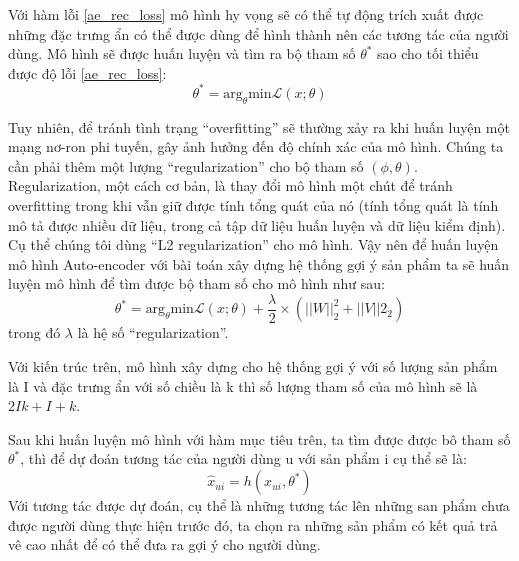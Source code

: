     Với hàm lỗi \ref{ae_rec_loss} mô hình hy vọng sẽ có thể tự động trích xuất được những đặc trưng ẩn có thể được dùng để hình thành nên các tương tác của người dùng.
    Mô hình sẽ được huấn luyện và tìm ra bộ tham số $\theta^*$ sao cho tối thiểu được độ lỗi \ref{ae_rec_loss}: 
    \begin{equation}
        \theta^* = \text{arg}_\theta \text{min}  \mathcal{L}(x;\theta)
    \end{equation}    
    

    Tuy nhiên, để tránh tình trạng ``overfitting'' sẽ thường xảy ra khi huấn luyện một mạng nơ-ron phi tuyến, gây ảnh hưởng đến độ chính xác của mô hình. 
    Chúng ta cần phải thêm một lượng ``regularization'' cho bộ tham số $(\phi,\theta)$.
    Regularization, một cách cơ bản, là thay đổi mô hình một chút để tránh overfitting trong khi vẫn giữ được tính tổng quát của nó (tính tổng quát là tính mô tả được nhiều dữ liệu, trong cả tập dữ liệu huấn luyện và dữ liệu kiểm định).
    Cụ thể chúng tôi dùng ``L2 regularization'' cho mô hình.
    Vậy nên để huấn luyện mô hình Auto-encoder với bài toán xây dựng hệ thống gợi ý sản phẩm ta sẽ huấn luyện mô hình để tìm được bộ tham số cho mô hình  như sau:
    \begin{equation}
        \label{ae_rec_obj}
        \theta^* = \text{arg}_\theta \text{min}  \mathcal{L}(x;\theta)  + \frac \lambda 2 \times (||W||^2_2 + ||V||2_2)
    \end{equation}
    trong đó $\lambda$ là hệ số ``regularization''.

    Với kiến trúc trên, mô hình xây dựng cho hệ thống gợi ý với số lượng sản phẩm là I và đặc trưng ẩn với số chiều là k thì số lượng tham số của mô hình sẽ là $2Ik + I + k$.
    
    Sau khi huấn luyện mô hình với hàm mục tiêu trên, ta tìm được được bô tham số $\theta^*$, thì để dự đoán tương tác của người dùng u với sản phẩm i cụ thể sẽ là: 
    $$\widehat{x}_{ui} = h(x_{ui},\theta^*)$$
    Với tương tác được dự đoán, cụ thể là những tương tác lên những san phẩm chưa được người dùng thực hiện trước đó, ta chọn ra những sản phẩm có kết quả trả vê cao nhất để có thể đưa ra gợi ý cho người dùng. 


